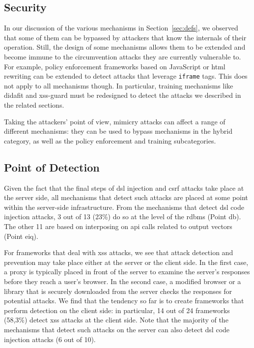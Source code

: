 \documentclass[conference]{IEEEtran}
\begin{document}
\subsection{Security}

In our discussion of the various mechanisms in Section~\ref{sec:defs}, we
observed that some of them can be bypassed by attackers that know
the internals of their operation.
Still, the design of some mechanisms allows them to
be extended and become immune to the circumvention attacks they are
currently vulnerable to. For example, policy enforcement frameworks
based on JavaScript or {\sc html} rewriting can be extended
to detect attacks that leverage {\tt iframe} tags. This does not apply
to all mechanisms though. In particular, training mechanisms like {\sc
  didafit} and {\sc xss-guard} must be redesigned to detect the
attacks we described in the related sections.

Taking the attackers' point of view, mimicry attacks can affect a
range of different mechanisms: they can be used to bypass mechanisms
in the hybrid category, as well as the policy enforcement and training
subcategories.

\subsection{Point of Detection}

Given the fact that the final steps of
{\sc dsl} injection and {\sc csrf} attacks take place
at the server side, all mechanisms that detect
such attacks are placed at some point within the server-side infrastructure.
From the mechanisms that detect {\sc dsl} code injection
attacks, 3 out of 13 (23\%) do so at the level
of the {\sc rdbms} (Point {\sc db}).
The other 11 are based on interposing on {\sc api} calls related to output
vectors (Point {\sc e}i{\sc q}).

For frameworks that deal with {\sc xss} attacks, we
see that attack detection and prevention may take place either at the server or
the client side. In the first case, a proxy is typically placed in front of the server
to examine the server's responses before they reach a user's 
browser. In the second case, a modified browser or a library that is
securely downloaded from the server checks the responses for potential
attacks. We find that the tendency so far is to create frameworks that
perform detection on the client side: in particular, 14 out of 24
frameworks (58,3\%) detect {\sc xss} attacks at the
client side. Note that the majority of the mechanisms that detect
such attacks on the server can also detect {\sc dsl} code
injection attacks (6 out of 10).
\end{document}
